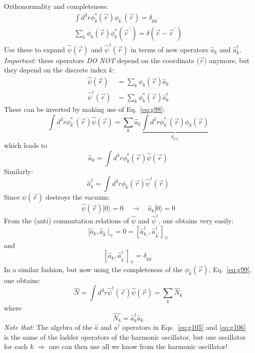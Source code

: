 \documentclass[12pt]{article}
\newcommand{\be}{\begin{equation}}
\newcommand{\ee}{\end{equation}}
\begin{document}
Orthonormality and completeness:
\begin{gather}
\int d^{3} r \phi_{k}^{*}(\vec{r}) \phi_{k^{\prime}}(\vec{r})=\delta_{k k^{\prime}}
\label{eq:g98}\\
\sum_{k} \phi_{k}(\vec{r}) \phi_{k}^{*}\left(\vec{r}^{\,\prime}\right)=\delta\left(\vec{r}-\vec{r}^{\,\prime}\right)
\label{eq:g99}
\end{gather}
Use these to expand $\hat{\psi}(\vec{r})$ and $\hat{\psi}^\dagger(\vec{r})$ in terms of
new operators $\hat{a}_{k}$ and $\hat{a}^\dagger_{k}$.
\emph{Important:} these operators \emph{DO NOT} depend on 
the coordinate ($\vec{r}$) anymore, 
but they depend on the discrete index $k$:
\begin{align}
\hat{\psi}(\vec{r})&=\sum_{k} \phi_{k}(\vec{r}) \hat{a}_{k}\\
\hat{\psi}^\dagger(\vec{r})&=\sum_{k} \phi_{k}^*(\vec{r}) \hat{a}^\dagger_{k}
\end{align}
%
These can be inverted by making use of Eq.~\eqref{eq:g98}:
\[
\int d^{3} r \phi_{k^\prime}^{*}(\vec{r}) \hat{\psi}(\vec{r})=\sum_{k} \hat{a}_{k}  
\underbrace{\int d^{3} r\phi^*_{k^\prime}(\vec{r}) \phi_{k}(\vec{r})}_{\delta_{k^\prime k}}
\]
which leads to
\be
\hat{a}_{k}=\int d^{3} r \phi_{k}^{*}(\vec{r}) \hat{\psi}(\vec{r})
\ee
Similarly:
\be
\hat{a}^\dagger_{k}=\int d^{3} r \phi_{k}(\vec{r}) \hat{\psi}^{\dagger}(\vec{r})
\ee
Since $\psi(\vec{r})$ destroys the vacuum:
\be
\hat{\psi}(\vec{r})|0\rangle=0 \quad \longrightarrow \quad \hat{a}_{k}|0\rangle=0
\label{eq:g104}
\ee
From the (anti) commutation relations of $\hat{\psi}$ and $\hat{\psi}^\dagger$,
one obtains very easily:
\be
\Big[\hat{a}_{k}, \hat{a}_{k^{\prime}}\Big]_{\mp}=0=\left[\hat{a}_{k,}^{\dagger}, \hat{a}_{k^{\prime}}^{\dagger}\right]_{\mp}
\label{eq:g105}
\ee
and
\be
\left[\hat{a}_{k}, \hat{a}_{k^{\prime}}^{\dagger}\right]_{\mp}=\delta_{k k^{\prime}}
\label{eq:g106}
\ee
In a similar fashion, but now using the completeness
of the $\phi_{k}(\vec{r})$, Eq.~\eqref{eq:g99}, one obtains:
\be
\hat{N}=\int d^{3}r \hat{\psi}^\dagger(\vec{r}) \hat{\psi}(\vec{r})=\sum_{k} \hat{N}_{k}
\ee
where
\be
\hat{N_{k}}=\hat{a}_{k}^{\dagger} \hat{a}_{k}
\ee
\emph{Note that}: The algebra of the $\hat{a}$ and $a^{\dagger}$ operators
in Eqs.~\eqref{eq:g105} and \eqref{eq:g106} is the same of the ladder
operators of the harmonic oscillator, but one
oscillator for each $k$
$\Rightarrow$
one can then use all we know from
the harmonic oscillator!
\end{document}
